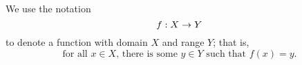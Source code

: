 \documentclass{rl_theory/note}
\begin{document}
\begin{note}
  We use the notation
  $$f : X \rightarrow Y$$
  to denote a function with domain $X$ and range $Y$;
  that is, 
  $$\text{for all $x \in X$, there is some $y \in Y$ such that $f(x) = y$}.$$%
\end{note}
\end{document}
